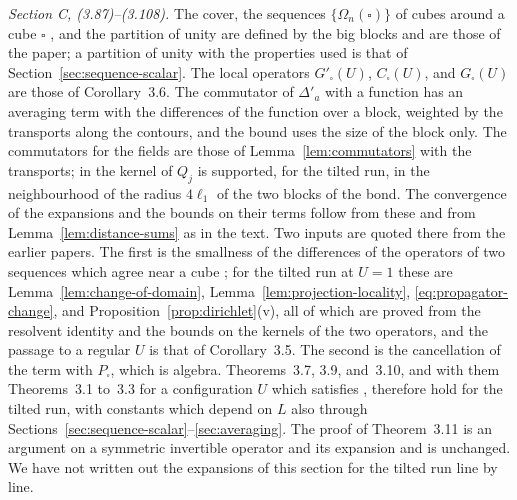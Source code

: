 \documentclass[11pt]{preprint}
\numberwithin{equation}{section}
\theoremstyle{definition}
\theoremstyle{remark}
\theoremstyle{plain}
\begin{document}
\emph{Section C, (3.87)--(3.108).} The cover, the sequences $\{ \Omega_n(\square) \}$ of cubes around a cube $\square$ \cite[p.~408]{BalabanPBG}, and the partition of unity are defined by the big blocks and are those of the paper; a partition of unity with the properties used is that of Section~\ref{sec:sequence-scalar}. The local operators $G'_\square(U)$, $C_\square(U)$, and $G_\square(U)$ are those of Corollary~3.6. The commutator \cite[(3.88)]{BalabanPBG} of $\Delta'_a$ with a function has an averaging term with the differences of the function over a block, weighted by the transports along the contours, and the bound \cite[(3.89)]{BalabanPBG} uses the size of the block only. The commutators \cite[(3.100)--(3.104)]{BalabanPBG} for the fields are those of Lemma~\ref{lem:commutators} with the transports; in \cite[(3.102)]{BalabanPBG} the kernel of $Q_j$ is supported, for the tilted run, in the neighbourhood of the radius $4\ell_1$ of the two blocks of the bond. The convergence of the expansions \cite[(3.90), (3.96), (3.98), (3.106), (3.107)]{BalabanPBG} and the bounds \cite[(3.94), (3.99), (3.108)]{BalabanPBG} on their terms follow from these and from Lemma~\ref{lem:distance-sums} as in the text. Two inputs are quoted there from the earlier papers. The first is the smallness of the differences of the operators of two sequences which agree near a cube \cite[(3.97)]{BalabanPBG}; for the tilted run at $U = 1$ these are Lemma~\ref{lem:change-of-domain}, Lemma~\ref{lem:projection-locality}, \eqref{eq:propagator-change}, and Proposition~\ref{prop:dirichlet}(v), all of which are proved from the resolvent identity and the bounds on the kernels of the two operators, and the passage to a regular $U$ is that of Corollary~3.5. The second is the cancellation \cite[p.~415]{BalabanPBG} of the term with $P_\square$, which is algebra. Theorems~3.7, 3.9, and~3.10, and with them Theorems~3.1 to~3.3 for a configuration $U$ which satisfies \cite[(3.35)]{BalabanPBG}, therefore hold for the tilted run, with constants which depend on $L$ also through Sections~\ref{sec:sequence-scalar}--\ref{sec:averaging}. The proof of Theorem~3.11 is an argument on a symmetric invertible operator and its expansion and is unchanged. We have not written out the expansions of this section for the tilted run line by line.
\end{document}
